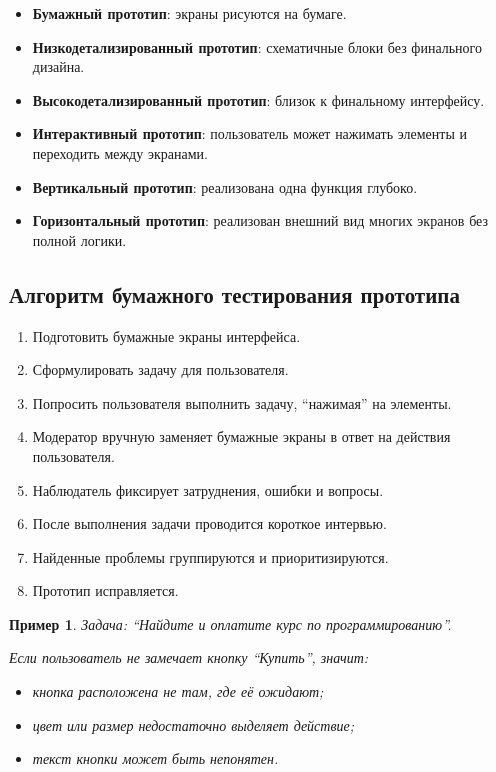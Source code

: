 \documentclass[12pt,a4paper]{article}
\newtheorem{example}{Пример}
\begin{document}
\begin{itemize}
    \item \textbf{Бумажный прототип}: экраны рисуются на бумаге.
    \item \textbf{Низкодетализированный прототип}: схематичные блоки без финального дизайна.
    \item \textbf{Высокодетализированный прототип}: близок к финальному интерфейсу.
    \item \textbf{Интерактивный прототип}: пользователь может нажимать элементы и переходить между экранами.
    \item \textbf{Вертикальный прототип}: реализована одна функция глубоко.
    \item \textbf{Горизонтальный прототип}: реализован внешний вид многих экранов без полной логики.
\end{itemize}

\subsection{Алгоритм бумажного тестирования прототипа}

\begin{enumerate}
    \item Подготовить бумажные экраны интерфейса.
    \item Сформулировать задачу для пользователя.
    \item Попросить пользователя выполнить задачу, ``нажимая'' на элементы.
    \item Модератор вручную заменяет бумажные экраны в ответ на действия пользователя.
    \item Наблюдатель фиксирует затруднения, ошибки и вопросы.
    \item После выполнения задачи проводится короткое интервью.
    \item Найденные проблемы группируются и приоритизируются.
    \item Прототип исправляется.
\end{enumerate}

\begin{example}
Задача: ``Найдите и оплатите курс по программированию''.

Если пользователь не замечает кнопку ``Купить'', значит:
\begin{itemize}
    \item кнопка расположена не там, где её ожидают;
    \item цвет или размер недостаточно выделяет действие;
    \item текст кнопки может быть непонятен.
\end{itemize}
\end{example}
\end{document}
